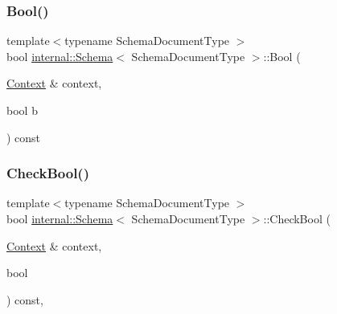 \mbox{\label{classinternal_1_1Schema_ae7c03b431a9018ce0feb674f5cb45423}} 
\subsubsection{\texorpdfstring{Bool()}{Bool()}}
{\footnotesize\ttfamily template$<$typename Schema\+Document\+Type $>$ \\
bool \hyperlink{classinternal_1_1Schema}{internal\+::\+Schema}$<$ Schema\+Document\+Type $>$\+::Bool (\begin{DoxyParamCaption}\item[{\hyperlink{classinternal_1_1Schema_ac3f54abfefe300c5610c1205869cfd66}{Context} \&}]{context,  }\item[{bool}]{b }\end{DoxyParamCaption}) const\hspace{0.3cm}{\ttfamily [inline]}}

\mbox{\label{classinternal_1_1Schema_a7460717070f7e73b77b9d3bcb00931da}} 
\subsubsection{\texorpdfstring{Check\+Bool()}{CheckBool()}}
{\footnotesize\ttfamily template$<$typename Schema\+Document\+Type $>$ \\
bool \hyperlink{classinternal_1_1Schema}{internal\+::\+Schema}$<$ Schema\+Document\+Type $>$\+::Check\+Bool (\begin{DoxyParamCaption}\item[{\hyperlink{classinternal_1_1Schema_ac3f54abfefe300c5610c1205869cfd66}{Context} \&}]{context,  }\item[{bool}]{ }\end{DoxyParamCaption}) const\hspace{0.3cm}{\ttfamily [inline]}, {\ttfamily [private]}}

\mbox{\label{classinternal_1_1Schema_a941437c7594d2d1a66aab371c08dcd4a}} 
